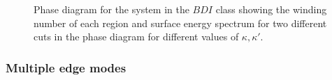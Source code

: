 \documentclass[twocolumn,amsmath,longbibliography,amssymb,superscriptaddress]{revtex4-1}
\begin{document}
\begin{figure}[h!]
\centering
{}
\caption{Phase diagram for the system in the $BDI$ class showing the winding number of each region and surface energy spectrum for two different cuts in the phase diagram for different values of $\kappa,\kappa'$.}
\label{huang}
\end{figure}

\subsubsection{Multiple edge modes}
\end{document}

